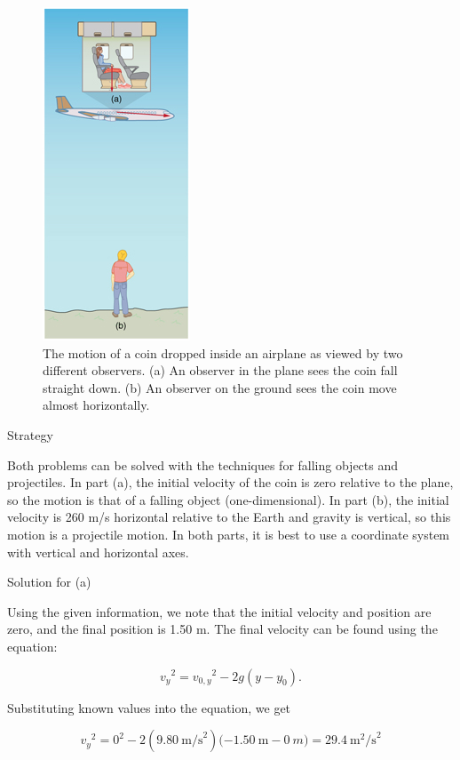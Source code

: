 \documentclass[
]{book}
\begin{document}
\begin{figure}
\hypertarget{import-auto-id1944737}{%
\centering
\includegraphics{images/Figure_03_05_06a.jpg}
\caption{The motion of a coin dropped inside an airplane as viewed by two
different observers. (a) An observer in the plane sees the coin fall
straight down. (b) An observer on the ground sees the coin move almost
horizontally.}\label{import-auto-id1944737}
}
\end{figure}

{Strategy}

Both problems can be solved with the techniques for falling objects and
projectiles. In part (a), the initial velocity of the coin is zero
relative to the plane, so the motion is that of a falling object
(one-dimensional). In part (b), the initial velocity is 260 m/s
horizontal relative to the Earth and gravity is vertical, so this motion
is a projectile motion. In both parts, it is best to use a coordinate
system with vertical and horizontal axes.

{Solution for (a)}

Using the given information, we note that the initial velocity and
position are zero, and the final position is 1.50 m. The final velocity
can be found using the equation:

\leavevmode{}%
\[{{{{v_{y}}^{2} = {{v_{0,y}}^{2} - 2g}}({y - y_{0}})}\text{.}}{}\]

Substituting known values into the equation, we get

\leavevmode{}%
\[{{{v_{y}}^{2} = {0^{2} - 2}}(9\text{.}\text{80}\ \text{m/s}^{2}){( - 1}\text{.}\text{50}\ {\text{m} - 0\ m}{) = \text{29}}\text{.}4\ \text{m}^{2}\text{/s}^{2}}{}\]
\end{document}
